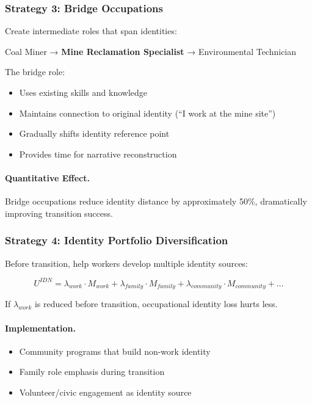 \subsubsection{Strategy 3: Bridge Occupations}

Create intermediate roles that span identities:

\begin{center}
Coal Miner → \textbf{Mine Reclamation Specialist} → Environmental Technician
\end{center}

The bridge role:
\begin{itemize}
    \item Uses existing skills and knowledge
    \item Maintains connection to original identity (``I work at the mine site'')
    \item Gradually shifts identity reference point
    \item Provides time for narrative reconstruction
\end{itemize}

\paragraph{Quantitative Effect.}
Bridge occupations reduce identity distance by approximately 50\%, 
dramatically improving transition success.

\subsubsection{Strategy 4: Identity Portfolio Diversification}

Before transition, help workers develop multiple identity sources:

\begin{equation}
U^{IDN} = \lambda_{work} \cdot M_{work} + \lambda_{family} \cdot M_{family} + \lambda_{community} \cdot M_{community} + \ldots
\end{equation}

If $\lambda_{work}$ is reduced before transition, occupational identity 
loss hurts less.

\paragraph{Implementation.}
\begin{itemize}
    \item Community programs that build non-work identity
    \item Family role emphasis during transition
    \item Volunteer/civic engagement as identity source
\end{itemize}

